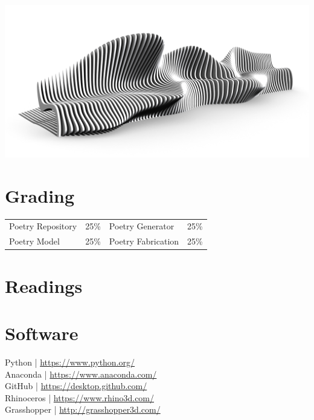 \documentclass[11pt,article,oneside]{memoir}
\begin{document}
\includegraphics[width=\textwidth]{../images/parametric_bench/parametric_bench_2.png}


\section{Grading}
%
\begin{table}[H]
\begin{tabular}{l r @{\hskip 2.5cm} l r}
%
Poetry Repository & 25\% & 
Poetry Generator & 25\% \\
Poetry Model & 25\% &
Poetry Fabrication & 25\% \\
%
\end{tabular}
\end{table}

\clearpage

\section{Readings}
\renewcommand*{\bibfont}{\normalsize} %
\vspace*{0.5cm}
\nocite{*}
\setlength{}
\printbibliography[heading=none]

\clearpage

\section{Software}
\begin{multicols}{2}
\raggedright
Python | \url{https://www.python.org/}\\
Anaconda | \url{https://www.anaconda.com/}\\
GitHub | \url{https://desktop.github.com/}\\
Rhinoceros | \url{https://www.rhino3d.com/}\\
Grasshopper | \url{http://grasshopper3d.com/}\\
\end{multicols}
\end{document}
